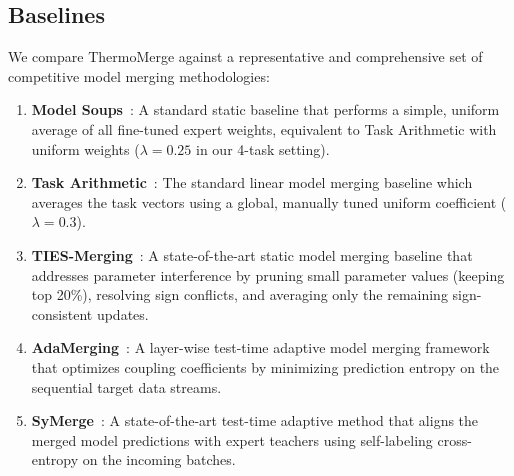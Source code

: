 \subsection{Baselines}
We compare ThermoMerge against a representative and comprehensive set of competitive model merging methodologies:
\begin{enumerate}
    \item \textbf{Model Soups}~\cite{wortsman2022model}: A standard static baseline that performs a simple, uniform average of all fine-tuned expert weights, equivalent to Task Arithmetic with uniform weights ($\lambda = 0.25$ in our 4-task setting).
    \item \textbf{Task Arithmetic}~\cite{ilharco2022editing}: The standard linear model merging baseline which averages the task vectors using a global, manually tuned uniform coefficient ($\lambda = 0.3$).
    \item \textbf{TIES-Merging}~\cite{yadav2023ties}: A state-of-the-art static model merging baseline that addresses parameter interference by pruning small parameter values (keeping top 20\%), resolving sign conflicts, and averaging only the remaining sign-consistent updates.
    \item \textbf{AdaMerging}~\cite{yang2024adamerging}: A layer-wise test-time adaptive model merging framework that optimizes coupling coefficients by minimizing prediction entropy on the sequential target data streams.
    \item \textbf{SyMerge}~\cite{jung2025symerge}: A state-of-the-art test-time adaptive method that aligns the merged model predictions with expert teachers using self-labeling cross-entropy on the incoming batches.
\end{enumerate}

